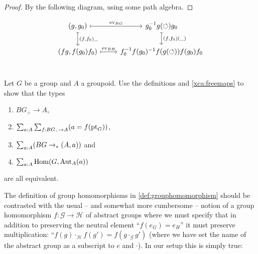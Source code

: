 \begin{proof}
By the following diagram, using some path algebra.
\end{proof}

\[
\begin{tikzcd} 
(g,g_0) \arrow[r, mapsto, "\ev_{BG}"] \arrow[d, mapsto, "{(f,f_0)\_}"] & 
g_0^{-1} g(\Sloop) g_0 \arrow[d, mapsto, "{(f,f_0)(\_)}"]\\
(fg,f(g_0)f_0) \arrow[r, mapsto, "\ev_{BH}"] & f_0^{-1} f(g_0)^{-1} f(g(\Sloop)) f(g_0) f_0 \\
\end{tikzcd}
\]


\begin{xca}\label{xca:BGtotype}
  Let $G$ be a group and $A$ a groupoid.  Use the definitions and
  \cref{xca:freemaps} to show that the types
  \begin{enumerate}
  \item $BG_\div\to A$, 
  \item $\sum_{a:A}\sum_{f:BG_\div \to A}(a=f(\pt_G))$, 
  \item $\sum_{a:A}(BG\to_\ast(A,a))$ and 
  \item $\sum_{a:A}\mathrm{Hom}(G,\mathrm{Aut}_A(a))$
  \end{enumerate}
 are all equivalent.
\end{xca}

The definition of group homomorphisms in \cref{def:grouphomomorphism} should be contrasted with the usual -- and somewhat more cumbersome -- notion of a group homomorphism $f\colon \mathcal G\to \mathcal H$ of abstract groups where we must specify that in addition to preserving the neutral element ``$f(e_G)=e_H$'' it must preserve multiplication: ``$f(g)\cdot_{\mathcal H} f(g')=f(g\cdot_{\mathcal G} g')$ (where we have set the name of the abstract group as a subscript to $e$ and $\cdot$).  In our setup this is simply true:

